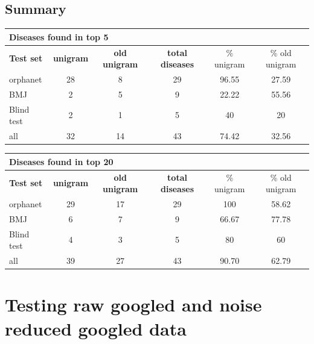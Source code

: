 \documentclass[10pt,letterpaper,final]{article}
\begin{document}
\subsection{Summary}
\label{app:summary_old_new}

\begin{center}
\begin{small}
\begin{tabular}{l|cc||ccc}
	\multicolumn{6}{l}{\textbf{Diseases found in top 5}} \\ \hline
\textbf{Test set} & \textbf{unigram} &	\textbf{old unigram}	 &	\textbf{total diseases} &	\% unigram	 &\% old unigram \\ \hline
orphanet &	28 &	8	 &	29 &	96.55 &	27.59 \\
BMJ	& 2 &	5	 &	9	 & 22.22 &	55.56 \\
Blind test	& 2 &	1	 &	5 &	40	 &20 \\ \hline \hline
all	& 32 &	14	 &	43 &	74.42 &	32.56 \\ \hline
\end{tabular}
\end{small}
\end{center}

\begin{center}
\begin{small}
\begin{tabular}{l|cc||ccc}
	\multicolumn{6}{l}{\textbf{Diseases found in top 20}} \\ \hline
\textbf{Test set} & \textbf{unigram} &	\textbf{old unigram}	 &	\textbf{total diseases} &	\% unigram	 &\% old unigram \\ \hline
orphanet &	29 &	17	 &	29 &	100	 & 58.62 \\
BMJ &	6 &	7 &		9 &	66.67 &	77.78 \\
Blind test &	4	 &3	 &	5 &	80	 &60 \\  \hline \hline
all	 &39	 &27 &		43 &	90.70 &	62.79\\ \hline
\end{tabular}
\end{small}
\end{center}

\newpage
\section{Testing raw googled and noise reduced googled data}
\label{app:tests_raw_reduced}
\end{document}
